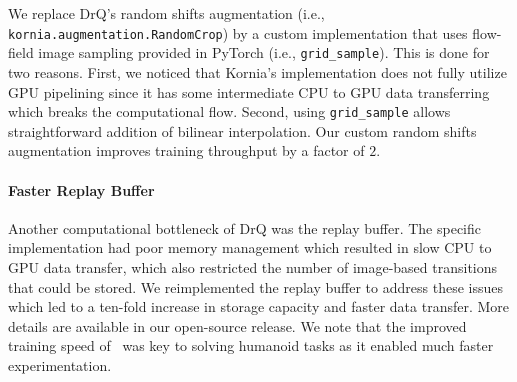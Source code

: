 We replace DrQ's random shifts augmentation (i.e., \texttt{kornia.augmentation.RandomCrop}) by a custom implementation that uses flow-field image sampling provided in PyTorch (i.e., \texttt{grid\_sample}). This is done for two reasons. First, we noticed that Kornia's implementation does not fully utilize GPU pipelining since it has some intermediate CPU to GPU data transferring which breaks the computational flow. Second, using \texttt{grid\_sample} allows straightforward addition of bilinear interpolation. Our custom random shifts augmentation improves training throughput by a factor of $2$. 
\paragraph{Faster Replay Buffer}
Another computational bottleneck of DrQ was the replay buffer. The specific implementation had poor memory management which resulted in slow CPU to GPU data transfer, which also restricted the number of image-based transitions that could be stored. We reimplemented the replay buffer to address these issues which led to a ten-fold increase in storage capacity and faster data transfer. More details are available in our open-source release. We note that the improved training speed of~\drqs{} was key to solving humanoid tasks as it enabled much faster experimentation. 






